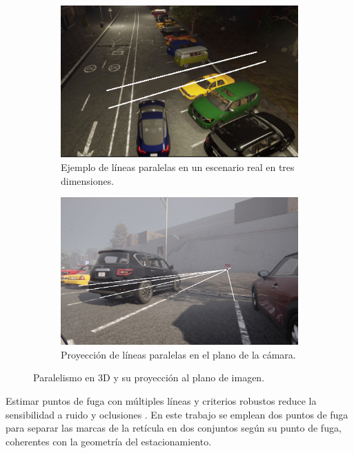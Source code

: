 \begin{figure}[!ht]
	\centering
	\begin{subfigure}{0.4\textwidth}
		\includegraphics[width=\textwidth]{img/reticule/paralel_lines}
		\caption{Ejemplo de líneas paralelas en un escenario real en tres dimensiones.}
	\end{subfigure}
	\begin{subfigure}{0.4\textwidth}
		\includegraphics[width=\textwidth]{img/reticule/pov}
		\caption{Proyección de líneas paralelas en el plano de la cámara.}
	\end{subfigure}
	\caption{Paralelismo en 3D y su proyección al plano de imagen.}
	\label{fig:distorion-teo}
\end{figure}

\noindent
Estimar puntos de fuga con múltiples líneas y criterios robustos reduce la sensibilidad a ruido y oclusiones 
\cite{hartley2003multiple,kanatani1998statistical}. En este trabajo se emplean dos puntos de fuga para separar
 las marcas de la retícula en dos conjuntos según su punto de fuga, coherentes con la geometría del estacionamiento.
